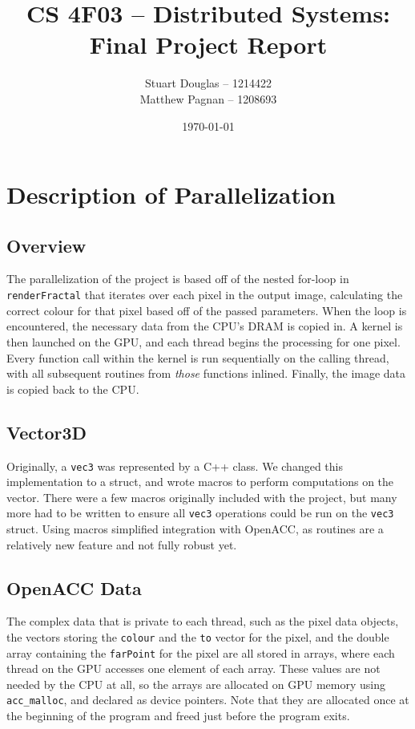 \documentclass[11pt]{article}
\title{
\LARGE CS 4F03 -- Distributed Systems:
\\\vspace{10mm}
\large \textbf{Final Project Report}
\vspace{40mm}
}
\author{
Stuart Douglas -- 1214422
\\Matthew Pagnan -- 1208693
\vspace{10mm}
}
\date{\vfill \today}
\begin{document}
\maketitle
\newpage
\tableofcontents
\newpage

\section{Description of Parallelization}
\subsection{Overview}
The parallelization of the project is based off of the nested for-loop in \texttt{renderFractal} that iterates over each pixel in the output image, calculating the correct colour for that pixel based off of the passed parameters. When the loop is encountered, the necessary data from the CPU's DRAM is copied in. A kernel is then launched on the GPU, and each thread begins the processing for one pixel. Every function call within the kernel is run sequentially on the calling thread, with all subsequent routines from \emph{those} functions inlined. Finally, the image data is copied back to the CPU.

\subsection{Vector3D}
Originally, a \texttt{vec3} was represented by a C++ class. We changed this implementation to a struct, and wrote macros to perform computations on the vector. There were a few macros originally included with the project, but many more had to be written to ensure all \texttt{vec3} operations could be run on the \texttt{vec3} struct. Using macros simplified integration with OpenACC, as routines are a relatively new feature and not fully robust yet.

\subsection{OpenACC Data}
The complex data that is private to each thread, such as the pixel data objects, the vectors storing the \texttt{colour} and the \texttt{to} vector for the pixel, and the double array containing the \texttt{farPoint} for the pixel are all stored in arrays, where each thread on the GPU accesses one element of each array. These values are not needed by the CPU at all, so the arrays are allocated on GPU memory using \texttt{acc\_malloc}, and declared as device pointers. Note that they are allocated once at the beginning of the program and freed just before the program exits.
\end{document}
